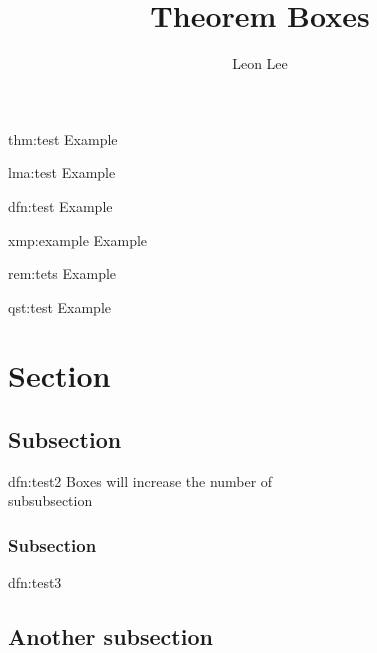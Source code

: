 \documentclass[]{article}
\title{Theorem Boxes}
\author{Leon Lee}
\begin{document}
\maketitle

\begin{thm}[Example]{thm:test}{}
    Example
\end{thm}

\begin{lma}[Example]{lma:test}{}
    Example
\end{lma}

\begin{dfn}[Example]{dfn:test}{}
    Example
\end{dfn}

\begin{xmp}[Example]{xmp:example}{}
    Example
\end{xmp}

\begin{rem}[Example]{rem:tets}{}
    Example
\end{rem}

\begin{qst}[Example]{qst:test}{}
    Example
\end{qst}

\newpage

\section{Section}
\subsection{Subsection}
\begin{dfn}{dfn:test2}{}
    Boxes will increase the number of \\subsubsection
\end{dfn}

\subsubsection{Subsection}

\begin{dfn}{dfn:test3}{}
    
\end{dfn}

\subsection{Another subsection}
\end{document}
